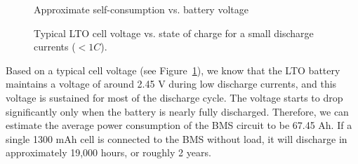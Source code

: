 \documentclass[11pt]{datasheet}
\begin{document}
\begin{figure}[ht]
    \centering
    \begin{minipage}{0.48\textwidth}
        \centering
        \caption{Approximate self-consumption vs. battery voltage}
        \label{fig:self-consumption}
    \end{minipage}%
    \hfill
    \begin{minipage}{0.48\textwidth}
        \centering
        \caption{Typical LTO cell voltage vs. state of charge for a small discharge currents ($< 1C$).}
        \label{fig:lto-voltage}
    \end{minipage}
\end{figure}

Based on a typical cell voltage (see Figure~\ref{fig:lto-voltage}), we know that
the LTO battery maintains a voltage of around 2.45 V during low discharge
currents, and this voltage is sustained for most of the discharge cycle. The
voltage starts to drop significantly only when the battery is nearly fully
discharged. Therefore, we can estimate the average power consumption of the BMS
circuit to be 67.45 \textmu{}Ah. If a single 1300 mAh cell is connected to the
BMS without load, it will discharge in approximately 19,000 hours, or roughly 2
years.
\end{document}
